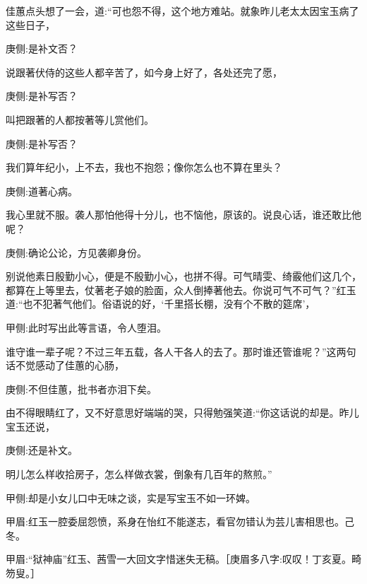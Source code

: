 \begin{parag}
    佳蕙点头想了一会，道:“可也怨不得，这个地方难站。就象昨儿老太太因宝玉病了这些日子，\begin{note}庚侧:是补文否？\end{note}说跟著伏侍的这些人都辛苦了，如今身上好了，各处还完了愿，\begin{note}庚侧:是补写否？\end{note}叫把跟著的人都按著等儿赏他们。\begin{note}庚侧:是补写否？\end{note}我们算年纪小，上不去，我也不抱怨；像你怎么也不算在里头？\begin{note}庚侧:道著心病。\end{note}我心里就不服。袭人那怕他得十分儿，也不恼他，原该的。说良心话，谁还敢比他呢？\begin{note}庚侧:确论公论，方见袭卿身份。\end{note}别说他素日殷勤小心，便是不殷勤小心，也拼不得。可气晴雯、绮霰他们这几个，都算在上等里去，仗著老子娘的脸面，众人倒捧著他去。你说可气不可气？”红玉道:“也不犯著气他们。俗语说的好，‘千里搭长棚，没有个不散的筵席’，\begin{note}甲侧:此时写出此等言语，令人堕泪。\end{note}谁守谁一辈子呢？不过三年五载，各人干各人的去了。那时谁还管谁呢？”这两句话不觉感动了佳蕙的心肠，\begin{note}庚侧:不但佳蕙，批书者亦泪下矣。\end{note}由不得眼睛红了，又不好意思好端端的哭，只得勉强笑道:“你这话说的却是。昨儿宝玉还说，\begin{note}庚侧:还是补文。\end{note}明儿怎么样收拾房子，怎么样做衣裳，倒象有几百年的熬煎。”\begin{note}甲侧:却是小女儿口中无味之谈，实是写宝玉不如一环婢。\end{note}\begin{note}甲眉:红玉一腔委屈怨愤，系身在怡红不能遂志，看官勿错认为芸儿害相思也。己冬。\end{note}\begin{note}甲眉:“狱神庙”红玉、茜雪一大回文字惜迷失无稿。［庚眉多八字:叹叹！丁亥夏。畸笏叟。］\end{note}
\end{parag}


